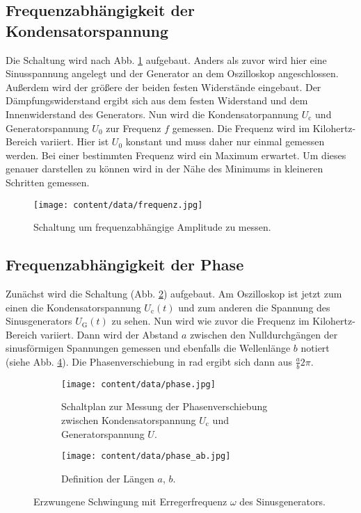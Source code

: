 \subsection{Frequenzabhängigkeit der Kondensatorspannung}
Die Schaltung wird nach Abb. \ref{fig:spannungc} aufgebaut.
Anders als zuvor wird hier eine Sinusspannung angelegt und der Generator an dem Oszilloskop angeschlossen.
Außerdem wird der größere der beiden festen Widerstände eingebaut.
Der Dämpfungswiderstand ergibt sich aus dem festen Widerstand und dem Innenwiderstand des Generators.
Nun wird die Kondensatorpannung $U_\text{c}$ und Generatorspannung $U_0$ zur Frequenz $f$ gemessen.
Die Frequenz wird im Kilohertz-Bereich variiert.
Hier ist $U_0$ konstant und muss daher nur einmal gemessen werden.
Bei einer bestimmten Frequenz wird ein Maximum erwartet.
Um dieses genauer darstellen zu können wird in der Nähe des Minimums in kleineren Schritten gemessen.
\begin{figure}
    \centering
    \texttt{[image: content/data/frequenz.jpg]}
    \caption{Schaltung um frequenzabhängige Amplitude zu messen. \cite[S.295]{anleitung}}
    \label{fig:spannungc}
\end{figure}

\subsection{Frequenzabhängigkeit der Phase}
Zunächst wird die Schaltung (Abb. \ref{fig:phase}) aufgebaut.
Am Oszilloskop ist jetzt zum einen die Kondensatorspannung $U_\text{c}(t)$ und zum anderen die Spannung des Sinusgenerators $U_\text{G}(t)$ zu sehen.
Nun wird wie zuvor die Frequenz im Kilohertz-Bereich variiert.
Dann wird der Abstand $a$ zwischen den Nulldurchgängen der sinusförmigen Spannungen gemessen und ebenfalls die Wellenlänge $b$ notiert (siehe Abb. \ref{fig:phase_ab}).
Die Phasenverschiebung in rad ergibt sich dann aus $\frac{a}{b}2\pi$.
\begin{figure}
    \centering
    \begin{subfigure}{0.48\textwidth}
        \centering
        \texttt{[image: content/data/phase.jpg]}
        \caption{Schaltplan zur Messung der Phasenverschiebung zwischen Kondensatorspannung $U_\text{c}$ und Generatorspannung $U$. \cite[S.296]{anleitung}}
        \label{fig:phase}
    \end{subfigure}
    \begin{subfigure}{0.48\textwidth}
        \centering
        \texttt{[image: content/data/phase\_ab.jpg]}
        \caption{Definition der Längen $a$, $b$. \cite[S.282]{anleitung_rc}} 
        \label{fig:phase_ab}
    \end{subfigure}
    \caption{Erzwungene Schwingung mit Erregerfrequenz $\omega$ des Sinusgenerators.}
\end{figure}
